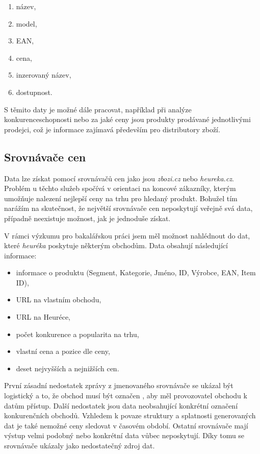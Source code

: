 \documentclass[thesis=B,czech]{FITthesis}[2012/06/26]
\begin{document}
\begin{enumerate}
\item název,
\item model,
\item EAN,
\item cena,
\item inzerovaný název,
\item dostupnost.
\end{enumerate}

S těmito daty je možné dále pracovat, například při analýze konkurenceschopnosti nebo za jaké ceny jsou produkty prodávané
jednotlivými prodejci, což je informace zajímavá především pro distributory zboží. \cite{hunka}

\subsection{Srovnávače cen}

Data lze získat pomocí srovnávačů cen jako jsou \textit{zbozi.cz}\cite{heureka} 
nebo \textit{heureka.cz}\cite{zbozi}. Problém u těchto služeb spočívá v orientaci na koncové zákazníky, kterým umožňuje
nalezení nejlepší ceny na trhu pro hledaný produkt. Bohužel tím narážím na skutečnost, že největší srovnávače cen neposkytují veřejně 
svá data, případně neexistuje možnost, jak je jednoduše získat. 
\par
V rámci výzkumu pro bakalářskou práci jsem měl možnost nahlédnout do dat, které \textit{heuréka} poskytuje některým obchodům. \cite{hunka}
Data obsahují následující informace:

\begin{itemize}
\item informace o produktu (Segment, Kategorie, Jméno, ID, Výrobce, EAN, Item ID),
\item URL na vlastním obchodu,
\item URL na Heuréce,
\item počet konkurence a popularita na trhu,
\item vlastní cena a pozice dle ceny,
\item deset nejvyšších a nejnižších cen.
\end{itemize}

První zásadní nedostatek zprávy z jmenovaného srovnávače se ukázal být logistický a to, že obchod musí být označen ,
aby měl provozovatel obchodu k datům přístup. Další nedostatek jsou data neobsahující konkrétní označení konkurenčních obchodů.\cite{heureka-report}
Vzhledem k povaze struktury a splatnosti generovaných dat je také nemožné ceny sledovat v časovém období.
Ostatní srovnávače mají výstup velmi podobný nebo konkrétní data vůbec neposkytují. Díky tomu se srovnávače ukázaly jako nedostatečný zdroj dat.\cite{hunka}
\end{document}
